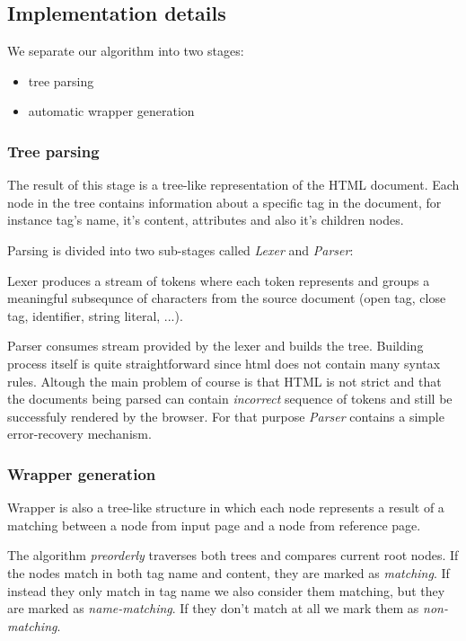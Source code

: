 \documentclass[runningheads]{llncs}
\begin{document}
\subsection{Implementation details}

We separate our algorithm into two stages:
\begin{itemize}
	\item tree parsing
	\item automatic wrapper generation
\end{itemize}

\subsubsection{Tree parsing}

The result of this stage is a tree-like representation of the HTML document. Each node in the tree contains information about a specific tag in the document, for instance tag's name, it's content, attributes and also it's children nodes. 

Parsing is divided into two sub-stages called \textit{Lexer} and \textit{Parser}:

Lexer produces a stream of tokens where each token represents and groups a meaningful subsequnce of characters from the source document (open tag, close tag, identifier, string literal, ...). 

Parser consumes stream provided by the lexer and builds the tree. Building process itself is quite straightforward since html does not contain many syntax rules. Altough the main problem of course is that HTML is not strict and that the documents being parsed can contain \textit{incorrect} sequence of tokens and still be successfuly rendered by the browser. For that purpose \textit{Parser} contains a simple error-recovery mechanism.

\subsubsection{Wrapper generation}

Wrapper is also a tree-like structure in which each node represents a result of a matching between a node from input page and a node from reference page. 

The algorithm \textit{preorderly} traverses both trees and compares current root nodes. If the nodes match in both tag name and content, they are marked as \textit{matching}. If instead they only match in tag name we also consider them matching, but they are marked as \textit{name-matching}. If they don't match at all we mark them as \textit{non-matching}.
\end{document}
